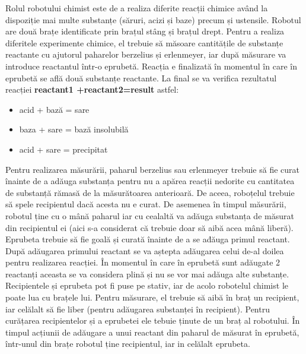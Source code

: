     Rolul robotului chimist este de a realiza diferite reacții chimice având la dispoziție mai multe substanțe (săruri, acizi și baze) precum și ustensile. Robotul are două brațe identificate prin brațul stâng și brațul drept. Pentru a realiza diferitele experimente chimice, el trebuie să măsoare cantitățile de substanțe reactante cu ajutorul paharelor berzelius și erlenmeyer, iar după măsurare va introduce reactantul într-o eprubetă. Reacția e finalizată în momentul în care în eprubetă se află două substanțe reactante. La final se va verifica rezultatul reacției \textbf{reactant1 +reactant2=result} astfel:
    \begin{itemize}
    \setlength\itemsep{0em}
        \item acid + bază = sare
        \item baza + sare = bază insolubilă
        \item acid + sare = precipitat 
    \end{itemize}
    Pentru realizarea măsurării, paharul berzelius sau erlenmeyer trebuie să fie curat înainte de a adăuga substanța pentru nu a apărea reacții nedorite cu cantitatea de substanță rămasă de la măsurătoarea anterioară. De aceea, roboțelul trebuie să spele recipientul dacă acesta nu e curat. De asemenea în timpul măsurării, robotul ține cu o mână paharul iar cu cealaltă va adăuga substanța de măsurat din recipientul ei (aici s-a considerat că trebuie doar să aibă acea mână liberă). \\ \newline
    Eprubeta trebuie să fie goală și curată înainte de a se ađăuga primul reactant. După adăugarea primului reactant se va aștepta adăugarea celui de-al doilea pentru realizarea reacției. În momentul în care în eprubetă sunt adăugate 2 reactanți aceasta se va considera plină și nu se vor mai adăuga alte substanțe.\\ \newline
    Recipientele și eprubeta pot fi puse pe stativ, iar de acolo robotelul chimist le poate lua cu brațele lui. Pentru măsurare, el trebuie să aibă în braț un recipient, iar celălalt să fie liber (pentru adăugarea substanței în recipient). Pentru curățarea recipientelor și a eprubetei ele tebuie ținute de un braț al robotului. În timpul acțiunii de adăugare a unui reactant din paharul de măsurat în eprubetă, într-unul din brațe robotul ține recipientul, iar in celălalt eprubeta. \\ \newline
    
